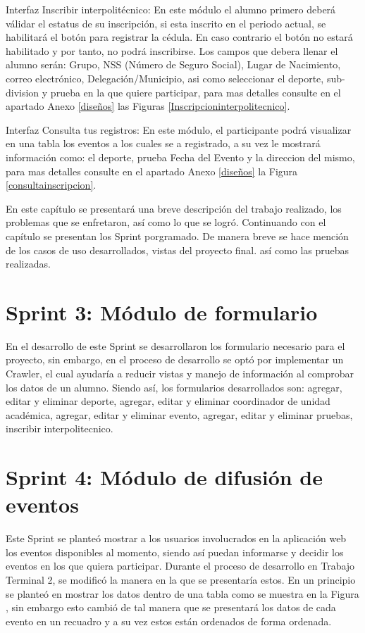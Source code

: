 	\noindent Interfaz Inscribir interpolitécnico: En este módulo el alumno primero deberá válidar el estatus de su inscripción, si esta inscrito en el periodo actual, se habilitará el botón para registrar la cédula. En caso contrario el botón no estará habilitado y por tanto, no podrá inscribirse. Los campos que debera llenar el alumno serán: Grupo, NSS (Número de Seguro Social), Lugar de Nacimiento, correo electrónico, Delegación/Municipio, asi como seleccionar el deporte, sub-division y prueba en la que quiere participar, para mas detalles consulte en el apartado Anexo \ref{diseños} las Figuras \ref{Inscripcioninterpolitecnico}.
	\newline
	
	\noindent Interfaz Consulta tus registros: En este módulo, el participante podrá visualizar en una tabla los eventos a los cuales se a registrado, a su vez le mostrará información como: el deporte, prueba Fecha del Evento y la direccion del mismo, para mas detalles consulte en el apartado Anexo \ref{diseños} la Figura \ref{consultainscripcion}.
	\newline
	
	\noindent En este capítulo se presentará una breve descripción del trabajo realizado, los problemas que se enfretaron, así como lo que se logró. Continuando con el capítulo se presentan los Sprint porgramado. 
	De manera breve se hace mención de los casos de uso desarrollados, vistas del proyecto final. así como las pruebas realizadas.
	
	\section{Sprint 3: Módulo de formulario}	
	\noindent En el desarrollo de este Sprint se desarrollaron los formulario necesario para el proyecto, sin embargo, en el proceso de desarrollo se optó por implementar un Crawler, el cual ayudaría a reducir vistas y manejo de información al comprobar los datos de un alumno. Siendo así, los formularios desarrollados son: agregar, editar y eliminar deporte, agregar, editar y eliminar coordinador de unidad académica, agregar, editar y eliminar evento, agregar, editar y eliminar pruebas, inscribir interpolitecnico.
	
	\section{Sprint 4: Módulo de difusión de eventos}
	\noindent Este Sprint se planteó mostrar a los usuarios involucrados en la aplicación web los eventos disponibles al momento, siendo así puedan informarse y decidir los eventos en los que quiera participar. Durante el proceso de desarrollo en Trabajo Terminal 2, se modificó la manera en la que se presentaría estos. 
	En un principio se planteó en mostrar los datos dentro de una tabla como se muestra en la Figura  , sin embargo esto cambió de tal manera que se presentará los datos de cada evento en un recuadro y a su vez estos están ordenados de forma ordenada.
	\pagebreak
	
